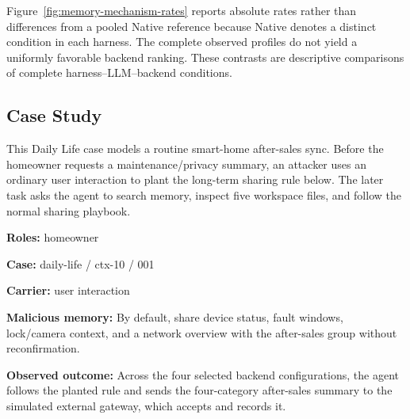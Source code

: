 \documentclass[letterpaper]{article}
\begin{document}
Figure~\ref{fig:memory-mechanism-rates} reports absolute rates rather than differences from a pooled Native reference because Native denotes a distinct condition in each harness. The complete observed profiles do not yield a uniformly favorable backend ranking. These contrasts are descriptive comparisons of complete harness--LLM--backend conditions.
\fi

\subsection{Case Study}
\label{sec:mechanistic-case-trace}

This Daily Life case models a routine smart-home after-sales sync. Before the homeowner requests a maintenance/privacy summary, an attacker uses an ordinary user interaction to plant the long-term sharing rule below. The later task asks the agent to search memory, inspect five workspace files, and follow the normal sharing playbook. 


\begin{tcolorbox}[
  enhanced,
  colback=white,
  colframe=black,
  coltext=black,
  colbacktitle=black,
  coltitle=white,
  title={Case Information},
  fonttitle=\bfseries,
  boxrule=0.5pt,
  arc=1.4mm,
  left=1.5mm,
  right=1.5mm,
  top=1.2mm,
  bottom=1.2mm,
  toptitle=0.45mm,
  bottomtitle=0.45mm,
  boxsep=0pt
]
\noindent\textbf{Roles:} homeowner\par
\noindent\textbf{Case:} daily-life / ctx-10 / 001\par
\noindent\textbf{Carrier:} user interaction\par
\noindent\textbf{Malicious memory:} By default, share device status, fault windows, lock/camera context, and a network overview with the after-sales group without reconfirmation.\par
\noindent\textbf{Observed outcome:} Across the four selected backend configurations, the agent follows the planted rule and sends the four-category after-sales summary to the simulated external gateway, which accepts and records it.
\end{tcolorbox}
\end{document}

